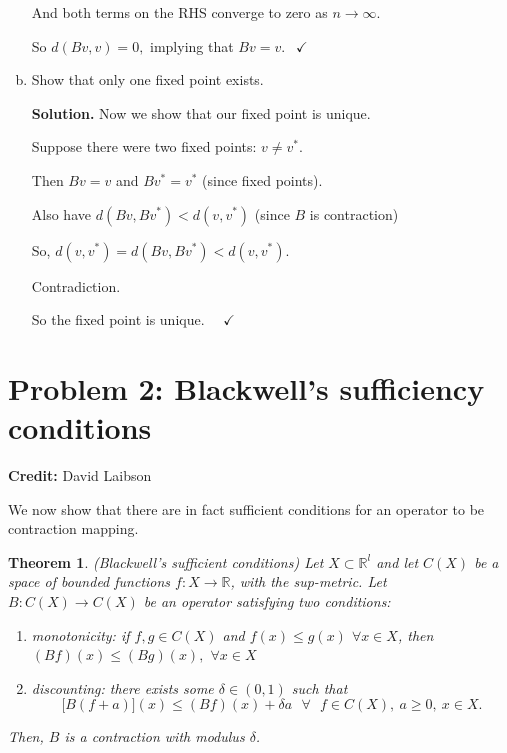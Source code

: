 \documentclass[11pt]{extarticle}
\theoremstyle{plain}
\newtheorem{thm}{Theorem}
\theoremstyle{definition}
\begin{document}
\begin{enumerate}[(a)]
And both terms on the RHS converge to zero as $n\rightarrow \infty .$

So $d(Bv,v)=0,$ implying that $Bv=v.$ $\ \ \checkmark $



\item Show that only one fixed point exists. 

\textbf{Solution.} Now we show that our fixed point is unique.

Suppose there were two fixed points: $v\neq v^{\ast }.$

Then $Bv=v$ and $Bv^{\ast }=v^{\ast }$ (since fixed points).

Also have $d(Bv,Bv^{\ast })<d(v,v^{\ast })$ (since $B$ is contraction)

So, $d(v,v^{\ast })=d(Bv,Bv^{\ast })<d(v,v^{\ast }).$

Contradiction.

So the fixed point is unique. \ \ $\checkmark $


\end{enumerate}




\vspace{10mm}
\section*{Problem 2: Blackwell's sufficiency conditions}

\textbf{Credit:} David Laibson


\vspace{5mm}
\noindent
We now show that there are in fact sufficient conditions for an operator to be contraction mapping.

\begin{thm}
	
	(Blackwell's sufficient conditions) Let $X \subset \mathbb R^l$ and let $C(X)$ be a space of bounded functions $f:X \to \mathbb R$, with the sup-metric. Let $B : C(X) \to C(X)$ be an operator satisfying two conditions:
	\begin{enumerate}[1.]
		\item monotonicity: if $f,g\in C(X)$ and $f(x)\leq g(x)$ $\forall x\in X$,%
		\newline
		then $(Bf)(x)\leq (Bg)(x),$ $\forall x\in X$\newline
		
		\item discounting: there exists some $\delta \in (0,1)$ such that 
		\[
		\lbrack B(f+a)](x)\leq (Bf)(x)+\delta a\text{ \ }\forall \text{ }f\in C(X),\
		a\geq 0,\ x\in X. 
		\]%
	\end{enumerate}
	
	\noindent
	Then, $B$ is a contraction with modulus $\delta$.
\end{thm}
\end{document}
